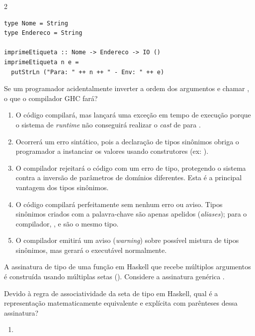 \documentclass[a4paper,10pt,brazil]{article}
\begin{document}
\begin{multicols}{2}
\begin{verbatim}
type Nome = String
type Endereco = String

imprimeEtiqueta :: Nome -> Endereco -> IO ()
imprimeEtiqueta n e =
  putStrLn ("Para: " ++ n ++ " - Env: " ++ e)
\end{verbatim}

Se um programador acidentalmente inverter a ordem dos argumentos e chamar , o que o compilador GHC fará?

\begin{enumerate}
  \item O código compilará, mas lançará uma exceção em tempo de execução porque o sistema de \emph{runtime} não conseguirá realizar o \emph{cast} de  para .

  \item Ocorrerá um erro sintático, pois a declaração de tipos sinônimos obriga o programador a instanciar os valores usando construtores (ex: ).

  \item O compilador rejeitará o código com um erro de tipo, protegendo o sistema contra a inversão de parâmetros de domínios diferentes. Esta é a principal vantagem dos tipos sinônimos.

  \item O código compilará perfeitamente sem nenhum erro ou aviso. Tipos sinônimos criados com a palavra-chave  são apenas apelidos (\emph{aliases}); para o compilador, ,  e  são o mesmo tipo.

  \item O compilador emitirá um aviso (\emph{warning}) sobre possível mistura de tipos sinônimos, mas gerará o executável normalmente.


\end{enumerate}

A assinatura de tipo de uma função em Haskell que recebe múltiplos argumentos é construída usando múltiplas setas (\haskellinline{->}). Considere a assinatura genérica . 

Devido à regra de associatividade da seta de tipo em Haskell, qual é a representação matematicamente equivalente e explícita com parênteses dessa assinatura?

\begin{enumerate}
  \item {}


\end{enumerate}
\end{multicols}
\end{document}

